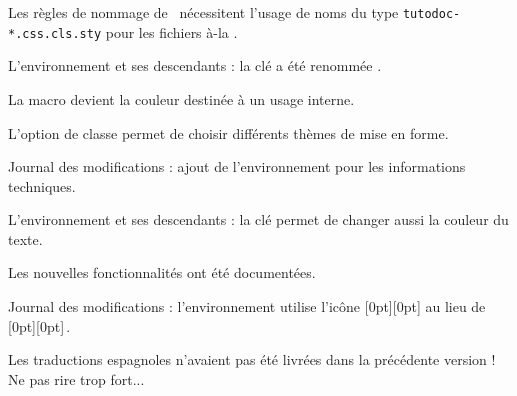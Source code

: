 \tdocsep




\begin{tdoctech}[version = 1.6.1, date = 2024-10-28]
    \item Les règles de nommage de \ctan\ nécessitent l'usage de noms du type \verb+tutodoc-*.css.cls.sty+ pour les fichiers à-la .
\end{tdoctech}

\tdocsep




\begin{tdocbreak}[version = 1.6.0, date = 2024-10-27]
    \item L'environnement  et ses descendants : la clé  a été renommée .

    \item La macro  devient la couleur  destinée à un usage interne.
\end{tdocbreak}


\begin{tdocnew}
    \item L'option de classe  permet de choisir différents thèmes de mise en forme.

    \item Journal des modifications : ajout de l'environnement  pour les informations techniques.

    \item L'environnement  et ses descendants : la clé  permet de changer aussi la couleur du texte.

    \item Les nouvelles fonctionnalités ont été documentées.
\end{tdocnew}


\begin{tdocupdate}
    \item Journal des modifications : l'environnement  utilise l'icône
    \raisebox{0pt}[0pt][0pt]{}
    au lieu de
    \raisebox{0pt}[0pt][0pt]{\fbox{\faMagic}}\,.
\end{tdocupdate}


\begin{tdocfix}
    \item Les traductions espagnoles n'avaient pas été livrées dans la précédente version ! Ne pas rire trop fort...
\end{tdocfix}

